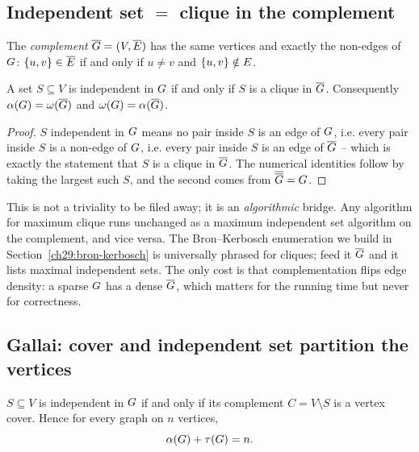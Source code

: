 \subsection{Independent set $=$ clique in the complement}

\begin{definition}
\label{ch29:def-complement}
The \emph{complement} $\overline{G}=(V,\overline{E})$ has the same vertices
and exactly the non-edges of $G$: $\{u,v\}\in\overline{E}$ if and only if
$u\neq v$ and $\{u,v\}\notin E$.
\end{definition}

\begin{proposition}
\label{ch29:prop-is-clique}
A set $S\subseteq V$ is independent in $G$ if and only if $S$ is a clique in
$\overline{G}$. Consequently $\alpha(G)=\omega(\overline{G})$ and
$\omega(G)=\alpha(\overline{G})$.
\end{proposition}

\begin{proof}
$S$ independent in $G$ means no pair inside $S$ is an edge of $G$, i.e.
every pair inside $S$ is a non-edge of $G$, i.e. every pair inside $S$ is an
edge of $\overline{G}$ -- which is exactly the statement that $S$ is a clique
in $\overline{G}$. The numerical identities follow by taking the largest such
$S$, and the second comes from $\overline{\overline{G}}=G$.
\end{proof}

This is not a triviality to be filed away; it is an \emph{algorithmic} bridge.
Any algorithm for maximum clique runs unchanged as a maximum independent set
algorithm on the complement, and vice versa. The Bron--Kerbosch enumeration we
build in Section~\ref{ch29:bron-kerbosch} is universally phrased for cliques;
feed it $\overline{G}$ and it lists maximal independent sets. The only cost is
that complementation flips edge density: a sparse $G$ has a dense
$\overline{G}$, which matters for the running time but never for correctness.

\subsection{Gallai: cover and independent set partition the vertices}

\begin{theorem}
\label{ch29:thm-gallai}
$S\subseteq V$ is independent in $G$ if and only if its complement
$C=V\setminus S$ is a vertex cover. Hence for every graph on $n$ vertices,
\[
  \alpha(G)+\tau(G)=n .
\]
\end{theorem}

